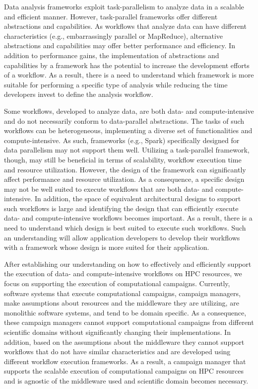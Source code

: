 Data analysis frameworks exploit task-parallelism to analyze data in a scalable
and efficient manner. However, task-parallel frameworks offer different
abstractions and capabilities. As workflows that analyze data can have
different characteristics (e.g., embarrassingly parallel or MapReduce),
alternative abstractions and capabilities may offer better performance and
efficiency. In addition to performance gains, the implementation of
abstractions and capabilities by a framework has the potential to increase the
development efforts of a workflow. As a result, there is a need to understand
which framework is more suitable for performing a specific type of analysis
while reducing the time developers invest to define the analysis workflow.

Some workflows, developed to analyze data, are both data- and compute-intensive
and do not necessarily conform to data-parallel abstractions. The tasks of such
workflows can be heterogeneous, implementing a diverse set of functionalities
and compute-intensive. As such, frameworks (e.g., Spark) specifically designed
for data parallelism may not support them well. Utilizing a task-parallel
framework, though, may still be beneficial in terms of scalability, workflow
execution time and resource utilization. However, the design of the framework
can significantly affect performance and resource utilization. As a
consequence, a specific design may not be well suited to execute workflows that
are both data- and compute-intensive. In addition, the space of equivalent
architectural designs to support such workflows is large and identifying the
design that can efficiently execute data- and compute-intensive workflows
becomes important. As a result, there is a need to understand which design is
best suited to execute such workflows. Such an understanding will allow
application developers to develop their workflows with a framework whose design
is more suited for their application.

After establishing our understanding on how to effectively and efficiently
support the execution of data- and compute-intensive workflows on HPC
resources, we focus on supporting the execution of computational campaigns.
Currently, software systems that execute computational campaigns, campaign
managers, make assumptions about resources and the middleware they are
utilizing, are monolithic software systems, and tend to be domain specific. As
a consequence, these campaign managers cannot support computational campaigns
from different scientific domains without significantly changing their
implementations. In addition, based on the assumptions about the middleware
they cannot support workflows that do not have similar characteristics and are
developed using different workflow execution frameworks. As a result, a
campaign manager that supports the scalable execution of computational
campaigns on HPC resources and is agnostic of the middleware used and
scientific domain becomes necessary.

